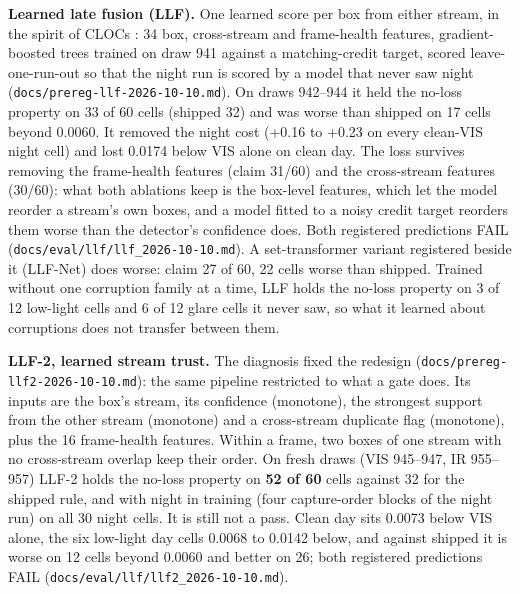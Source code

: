 \documentclass[10pt]{article}
\begin{document}
\textbf{Learned late fusion (LLF).} One learned score per box from either stream, in the spirit of CLOCs \citep{pang2020clocs}: 34 box, cross-stream and frame-health features, gradient-boosted trees trained on draw 941 against a matching-credit target, scored leave-one-run-out so that the night run is scored by a model that never saw night (\texttt{docs/\allowbreak{}prereg-llf-2026-10-10.md}). On draws 942--944 it held the no-loss property on 33 of 60 cells (shipped 32) and was worse than shipped on 17 cells beyond 0.0060. It removed the night cost (+0.16 to +0.23 on every clean-VIS night cell) and lost 0.0174 below VIS alone on clean day. The loss survives removing the frame-health features (claim 31/60) and the cross-stream features (30/60): what both ablations keep is the box-level features, which let the model reorder a stream's own boxes, and a model fitted to a noisy credit target reorders them worse than the detector's confidence does. Both registered predictions FAIL (\texttt{docs/\allowbreak{}eval/\allowbreak{}llf/\allowbreak{}llf\_\allowbreak{}2026-10-10.md}). A set-transformer variant registered beside it (LLF-Net) does worse: claim 27 of 60, 22 cells worse than shipped. Trained without one corruption family at a time, LLF holds the no-loss property on 3 of 12 low-light cells and 6 of 12 glare cells it never saw, so what it learned about corruptions does not transfer between them.

\textbf{LLF-2, learned stream trust.} The diagnosis fixed the redesign (\texttt{docs/\allowbreak{}prereg-llf2-2026-10-10.md}): the same pipeline restricted to what a gate does. Its inputs are the box's stream, its confidence (monotone), the strongest support from the other stream (monotone) and a cross-stream duplicate flag (monotone), plus the 16 frame-health features. Within a frame, two boxes of one stream with no cross-stream overlap keep their order. On fresh draws (VIS 945--947, IR 955--957) LLF-2 holds the no-loss property on \textbf{52 of 60} cells against 32 for the shipped rule, and with night in training (four capture-order blocks of the night run) on all 30 night cells. It is still not a pass. Clean day sits 0.0073 below VIS alone, the six low-light day cells 0.0068 to 0.0142 below, and against shipped it is worse on 12 cells beyond 0.0060 and better on 26; both registered predictions FAIL (\texttt{docs/\allowbreak{}eval/\allowbreak{}llf/\allowbreak{}llf2\_\allowbreak{}2026-10-10.md}).
\end{document}
